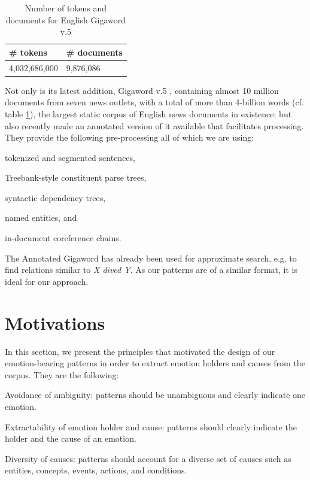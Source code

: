 \begin{table}[h]
\centering
\begin{tabular}{l|l}
{\bf \# tokens} & {\bf \# documents}\\\hline
4,032,686,000   & 9,876,086
\end{tabular}
\caption{Number of tokens and documents for English Gigaword v.5}
\label{tab:gigaword}
\end{table}

Not only is its latest addition, Gigaword v.5 \cite{gigaword}, containing almost 10 million documents from seven news outlets, with a total of more than 4-billion words (cf. table \ref{tab:gigaword}), the largest static corpus of English news documents in existence; but also \citeauthor{annotated_gigaword} recently made an annotated version of it available that facilitates processing. They provide the following pre-processing all of which we are using:

\begin{aenumerate}
	\item tokenized and segmented sentences,
	\item Treebank-style constituent parse trees,
	\item syntactic dependency trees,
	\item named entities, and
	\item in-document coreference chains.
\end{aenumerate}

The Annotated Gigaword has already been used for approximate search, e.g. to find relations similar to \textit{X dived Y}. As our patterns are of a similar format, it is ideal for our approach.

\section{Motivations} \label{sec:motivations}

In this section, we present the principles that motivated the design of our emotion-bearing patterns in order to extract emotion holders and causes from the corpus. They are the following:

\begin{aenumerate}
	\item Avoidance of ambiguity: patterns should be unambiguous and clearly indicate one emotion. 
	\item Extractability of emotion holder and cause: patterns should clearly indicate the holder and the cause of an emotion.
	\item Diversity of causes: patterns should account for a diverse set of causes such as entities, concepts, events, actions, and conditions.
\end{aenumerate}

